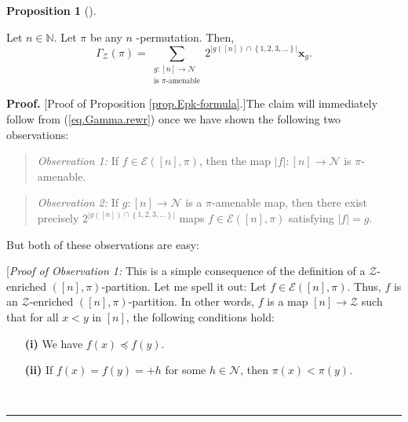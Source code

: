 \documentclass[numbers=enddot,12pt,final,onecolumn,notitlepage]{scrartcl}%
\theoremstyle{definition}
\newtheorem{prop}[theo]{Proposition}
\newenvironment{proposition}[1][]
{\begin{prop}[#1]\begin{leftbar}}
{\end{leftbar}\end{prop}}
\newenvironment{statement}{\begin{quote}}{\end{quote}}
\newenvironment{proof}[1][Proof]{\noindent\textbf{#1.} }{\ \rule{0.5em}{0.5em}}
\let\sumnonlimits\sum
\renewcommand{\sum}{\sumnonlimits\limits}
\begin{document}
\begin{proposition}
\label{prop.Epk-formula}Let $n\in\mathbb{N}$. Let $\pi$ be any $n$%
-permutation. Then,%
\[
\Gamma_{\mathcal{Z}}\left(  \pi\right)  =\sum_{\substack{g:\left[  n\right]
\rightarrow\mathcal{N}\\\text{is }\pi\text{-amenable}}}2^{\left\vert g\left(
\left[  n\right]  \right)  \cap\left\{  1,2,3,\ldots\right\}  \right\vert
}\mathbf{x}_{g}.
\]

\end{proposition}

\begin{proof}
[Proof of Proposition \ref{prop.Epk-formula}.]The claim will immediately
follow from (\ref{eq.Gamma.rewr}) once we have shown the following two observations:

\begin{statement}
\textit{Observation 1:} If $f\in\mathcal{E}\left(  \left[  n\right]
,\pi\right)  $, then the map $\left\vert f\right\vert :\left[  n\right]
\rightarrow\mathcal{N}$ is $\pi$-amenable.
\end{statement}

\begin{statement}
\textit{Observation 2:} If $g:\left[  n\right]  \rightarrow\mathcal{N}$ is a
$\pi$-amenable map, then there exist precisely $2^{\left\vert g\left(  \left[
n\right]  \right)  \cap\left\{  1,2,3,\ldots\right\}  \right\vert }$ maps
$f\in\mathcal{E}\left(  \left[  n\right]  ,\pi\right)  $ satisfying
$\left\vert f\right\vert =g$.
\end{statement}

But both of these observations are easy:

[\textit{Proof of Observation 1:} This is a simple consequence of the
definition of a $\mathcal{Z}$-enriched $\left(  \left[  n\right]  ,\pi\right)
$-partition. Let me spell it out: Let $f\in\mathcal{E}\left(  \left[
n\right]  ,\pi\right)  $. Thus, $f$ is an $\mathcal{Z}$-enriched $\left(
\left[  n\right]  ,\pi\right)  $-partition. In other words, $f$ is a map
$\left[  n\right]  \rightarrow\mathcal{Z}$ such that for all $x<y$ in $\left[
n\right]  $, the following conditions hold:

\begin{enumerate}
\item[\textbf{(i)}] We have $f\left(  x\right)  \preccurlyeq f\left(
y\right)  $.

\item[\textbf{(ii)}] If $f\left(  x\right)  =f\left(  y\right)  =+h$ for some
$h\in\mathcal{N}$, then $\pi\left(  x\right)  <\pi\left(  y\right)  $.


\end{enumerate}
\end{proof}
\end{document}
